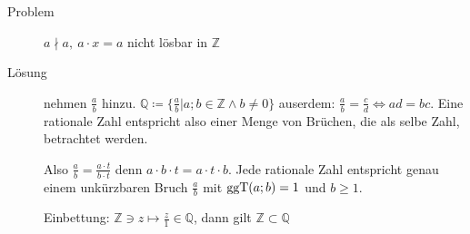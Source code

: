 \begin{description}
    \item[Problem] $a \nmid a,\ a \cdot x = a$ nicht lösbar in $\mathbb{Z}$
    \item[Lösung] nehmen $\frac{a}{b}$ hinzu. $\mathbb{Q} \coloneqq \lbrace \frac{a}{b} | a;b \in \mathbb{Z} \wedge b \not = 0 \rbrace$ auserdem: $\frac{a}{b} = \frac{c}{d} \Leftrightarrow ad = bc$.
    Eine rationale Zahl entspricht also einer Menge von Brüchen, die als selbe Zahl, betrachtet werden.

    Also $\frac{a}{b} = \frac{a \cdot t}{b \cdot t}$ denn $a \cdot b \cdot t = a \cdot t \cdot b$.
    Jede rationale Zahl entspricht genau einem unkürzbaren Bruch $\frac{a}{b}$ mit $\operatorname{ggT}(a;b) = 1$ und $b \geq 1$.

    Einbettung: $\mathbb{Z}\ni z \longmapsto \frac{z}{1} \in \mathbb{Q}$, dann gilt $\mathbb{Z} \subset \mathbb{Q}$


\end{description}
